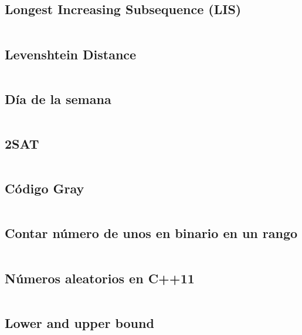 \documentclass[11pt]{article}
\begin{document}
		\subsection{Longest Increasing Subsequence (LIS)}
		\inputminted[tabsize=2,breaklines,firstline=5,lastline=19,fontsize=\small]{c++}{misc.cpp}
		
		\subsection{Levenshtein Distance}
		\inputminted[tabsize=2,breaklines,firstline=145,lastline=156,fontsize=\small]{c++}{misc.cpp}
		
		\subsection{Día de la semana}
		\inputminted[tabsize=2,breaklines,firstline=35,lastline=44,fontsize=\small]{c++}{misc.cpp}
		
		\subsection{2SAT}
		\inputminted[tabsize=2,breaklines,firstline=85,lastline=128,fontsize=\small]{c++}{misc.cpp}
		
		\subsection{Código Gray}
		\inputminted[tabsize=2,breaklines,firstline=130,lastline=143,fontsize=\small]{c++}{misc.cpp}
		
		\subsection{Contar número de unos en binario en un rango}
		\inputminted[tabsize=2,breaklines,firstline=158,lastline=165,fontsize=\small]{c++}{misc.cpp}
		
		\subsection{Números aleatorios en C++11}
		\inputminted[tabsize=2,breaklines,firstline=167,lastline=180,fontsize=\small]{c++}{misc.cpp}
		
		\subsection{Lower and upper bound}
		\inputminted[tabsize=2,breaklines,firstline=182,lastline=186,fontsize=\small]{c++}{misc.cpp}
		
\end{document}
